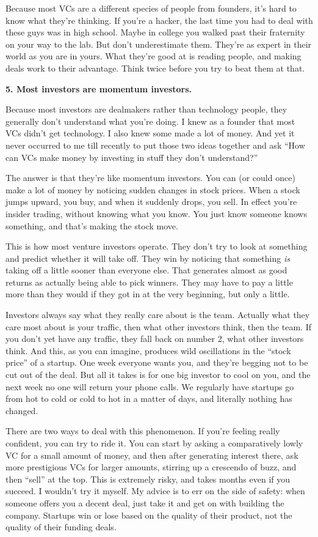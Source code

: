 Because most VCs are a different species of people from founders, it's
hard to know what they're thinking. If you're a hacker, the last time
you had to deal with these guys was in high school. Maybe in college you
walked past their fraternity on your way to the lab. But don't
underestimate them. They're as expert in their world as you are in
yours. What they're good at is reading people, and making deals work to
their advantage. Think twice before you try to beat them at that.

\textbf{5. Most investors are momentum investors.}

Because most investors are dealmakers rather than technology people,
they generally don't understand what you're doing. I knew as a founder
that most VCs didn't get technology. I also knew some made a lot of
money. And yet it never occurred to me till recently to put those two
ideas together and ask ``How can VCs make money by investing in stuff
they don't understand?''

The answer is that they're like momentum investors. You can (or could
once) make a lot of money by noticing sudden changes in stock prices.
When a stock jumps upward, you buy, and when it suddenly drops, you
sell. In effect you're insider trading, without knowing what you know.
You just know someone knows something, and that's making the stock move.

This is how most venture investors operate. They don't try to look at
something and predict whether it will take off. They win by noticing
that something \emph{is} taking off a little sooner than everyone else.
That generates almost as good returns as actually being able to pick
winners. They may have to pay a little more than they would if they got
in at the very beginning, but only a little.

Investors always say what they really care about is the team. Actually
what they care most about is your traffic, then what other investors
think, then the team. If you don't yet have any traffic, they fall back
on number 2, what other investors think. And this, as you can imagine,
produces wild oscillations in the ``stock price'' of a startup. One week
everyone wants you, and they're begging not to be cut out of the deal.
But all it takes is for one big investor to cool on you, and the next
week no one will return your phone calls. We regularly have startups go
from hot to cold or cold to hot in a matter of days, and literally
nothing has changed.

There are two ways to deal with this phenomenon. If you're feeling
really confident, you can try to ride it. You can start by asking a
comparatively lowly VC for a small amount of money, and then after
generating interest there, ask more prestigious VCs for larger amounts,
stirring up a crescendo of buzz, and then ``sell'' at the top. This is
extremely risky, and takes months even if you succeed. I wouldn't try it
myself. My advice is to err on the side of safety: when someone offers
you a decent deal, just take it and get on with building the company.
Startups win or lose based on the quality of their product, not the
quality of their funding deals.

